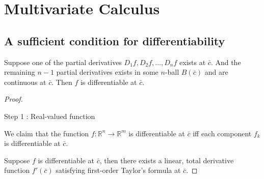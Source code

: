 \section{Multivariate Calculus}
\subsection{A sufficient condition for differentiability}
\begin{theorem}
Suppose one of the partial derivatives $D_1f,D_2f,\dots,D_nf$ exists at $\bar{c}$.
And the remaining $n-1$ partial derivatives exists in some $n$-ball $B(\bar{c})$ and are continuous at $\bar{c}$.
Then $f$ is differentiable at $\bar{c}$.
\end{theorem}
\begin{proof}
\begin{commentary}Step 1 : Real-valued function\end{commentary}

We claim that the function $f : \mathbb{R}^n \to \mathbb{R}^m$ is differentiable at $\bar{c}$ iff each component $f_k$ is differentiable at $\bar{c}$.

Suppose $f$ is differentiable at $\bar{c}$, then there exists a linear, total derivative function $f'(\bar{c})$ satisfying first-order Taylor's formula at $\bar{c}$.


\end{proof}
